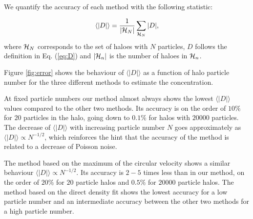 \documentclass{emulateapj}
\newcommand{\avg}[1]{\langle{#1}\rangle}
\begin{document}
We quantify the accuracy of each method with the following statistic:

\begin{equation}
\avg{|D|}=\frac{1}{\left|{\cal{H}}_N\right|}\sum_{{\cal{H}}_N} |D|,
\end{equation}
%
where ${\cal{H}}_N$ corresponds to the set of haloes with $N$
particles, $D$ follows the definition in Eq. (\ref{eq:D}) and
$\left|{\cal{H}}_n\right|$ is the number of haloes in ${\cal{H}}_n$.


Figure \ref{fig:error} shows the behaviour of $\avg{|D|}$ as a function of
halo particle number for the three different methods to estimate the
concentration.

At fixed particle numbers our method almost always shows the lowest
$\avg{|D|}$ values compared to the other two methods.
Its accuracy is on the order of $10\%$ for $20$ particles in the halo,
going down to $0.1\%$ for halos with $20000$ particles.
The decrease of $\avg{|D|}$ with increasing particle number $N$ goes
approximately as $\avg{|D|}\propto N^{-1/2}$, which reinforces the hint that
the accuracy of the method is related to a decrease of Poisson
noise.

The method based on the maximum of the circular velocity shows a similar
behaviour $\avg{|D|}\propto N^{-1/2}$. Its accuracy is $2-5$ times less
than in our method, on the order of $20\%$ for $20$ particle halos and
$0.5\%$ for $20000$ particle halos. The method based on the direct density
fit shows the lowest accuracy for a low particle number and an intermediate
accuracy between the other two methods for a high particle number.
\end{document}
